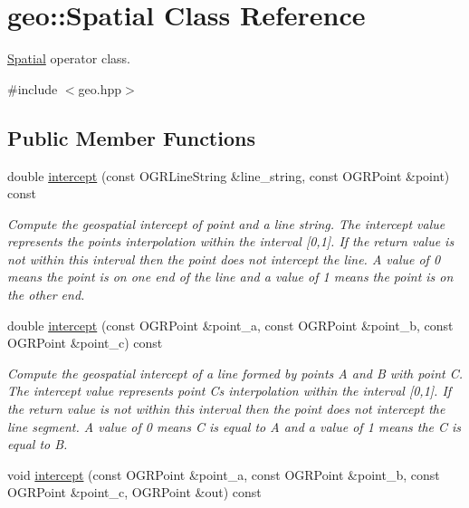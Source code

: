 \hypertarget{classgeo_1_1Spatial}{}\section{geo\+:\+:Spatial Class Reference}
\label{classgeo_1_1Spatial}


\hyperlink{classgeo_1_1Spatial}{Spatial} operator class.  




{\ttfamily \#include $<$geo.\+hpp$>$}

\subsection*{Public Member Functions}
\begin{DoxyCompactItemize}
\item 
double \hyperlink{classgeo_1_1Spatial_adcdd1f41c39d0999326828527c8e7aaa}{intercept} (const O\+G\+R\+Line\+String \&line\+\_\+string, const O\+G\+R\+Point \&point) const 
\begin{DoxyCompactList}\small\item\em Compute the geospatial intercept of point and a line string. The intercept value represents the point\textquotesingle{}s interpolation within the interval \mbox{[}0,1\mbox{]}. If the return value is not within this interval then the point does not intercept the line. A value of 0 means the point is on one end of the line and a value of 1 means the point is on the other end. \end{DoxyCompactList}\item 
double \hyperlink{classgeo_1_1Spatial_a5521d7ea795ff49abb99e324982764e4}{intercept} (const O\+G\+R\+Point \&point\+\_\+a, const O\+G\+R\+Point \&point\+\_\+b, const O\+G\+R\+Point \&point\+\_\+c) const 
\begin{DoxyCompactList}\small\item\em Compute the geospatial intercept of a line formed by points A and B with point C. The intercept value represents point C\textquotesingle{}s interpolation within the interval \mbox{[}0,1\mbox{]}. If the return value is not within this interval then the point does not intercept the line segment. A value of 0 means C is equal to A and a value of 1 means the C is equal to B. \end{DoxyCompactList}\item 
void \hyperlink{classgeo_1_1Spatial_abd029fbc910d1d983bb006f9729c4904}{intercept} (const O\+G\+R\+Point \&point\+\_\+a, const O\+G\+R\+Point \&point\+\_\+b, const O\+G\+R\+Point \&point\+\_\+c, O\+G\+R\+Point \&out) const 

\end{DoxyCompactItemize}
